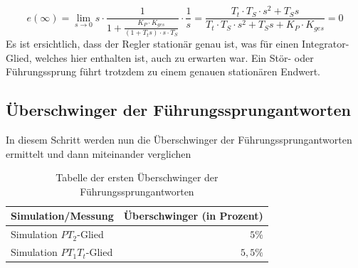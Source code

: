\documentclass{report}
\begin{document}
\begin{equation}
  \label{eq:4}
  e(\infty) = \lim_{s\to 0} s \cdot \frac{1}{1+\frac{K_{P}\cdot K_{ges}}{(1+T_{t}s)\cdot s \cdot T_{S}}} \cdot\frac{1}{s} = \frac{T_{t}\cdot T_{S} \cdot s^{2} + T_{S}s}{T_{t}\cdot T_{S} \cdot s^{2} + T_{S}s+K_{P}\cdot K_{ges}} = 0
\end{equation}
Es ist ersichtlich, dass der Regler stationär genau ist, was für einen Integrator-Glied, welches hier enthalten ist, auch zu erwarten war. Ein Stör- oder Führungssprung führt trotzdem zu einem genauen stationären Endwert.

\newpage

\subsection{Überschwinger der Führungssprungantworten}

In diesem Schritt werden nun die Überschwinger der Führungssprungantworten ermittelt und dann miteinander verglichen

\begin{table}[h]
  \centering
  \begin{tabular}{lr}
    \hline
    Simulation/Messung & Überschwinger (in Prozent) \\
    \hline
    Simulation $PT_{2}$-Glied & $5\%$ \\
    Simulation $PT_{1}T_{t}$-Glied & $5,5\%$ \\
    \hline
  \end{tabular}
  \caption{Tabelle der ersten Überschwinger der Führungssprungantworten}
  \label{tab:lead}
\end{table}
\end{document}
